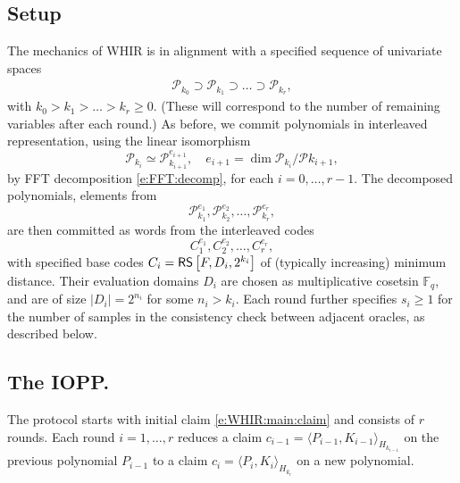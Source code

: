 \subsection{Setup}
The mechanics of WHIR is in alignment with a specified sequence of univariate spaces
\begin{align}
\label{e:chain:function:spaces}
\mathscr P_{k_0} \supset \mathscr P_{k_1} \supset \ldots \supset \mathscr P_{k_r},
\end{align}
with $k_{0} > k_1 > \ldots > k_{r}\geq 0$. 
(These will correspond to the number of remaining variables after each round.)
As before, we commit polynomials in interleaved representation, using the linear isomorphism
\[
\mathscr P_{k_i} \simeq \mathscr P_{k_{i+1}}^{e_{i+1}}, \quad e_{i+1} = \dim{\mathscr P_{k_i}/\mathscr P{k_{i+1}}},
\]
by FFT decomposition \eqref{e:FFT:decomp}, for each $i=0,\ldots, r-1$.
The decomposed polynomials, elements from
\begin{equation}
\mathscr P_{k_1}^{e_1}, \mathscr P_{k_2}^{e_2}, \ldots, \mathscr P_{k_{r}}^{e_{r}},
\end{equation}
are then %
committed as words from the interleaved codes
\begin{equation}
 C_1^{e_1}, C_2^{e_2}, \ldots, C_r^{e_r},
\end{equation}
with specified base codes $C_{i} = \mathsf{RS}\left[F, D_{i}, 2^{k_{i}}\right]$ of (typically increasing) minimum distance.
Their evaluation domains $D_i$ are chosen as multiplicative cosets\footnotemark in $\mathbb F_q$, and are of size $|D_{i}|= 2^{n_{i}}$ for some $n_i > k_{i}$. 
Each round further specifies $s_i\geq 1$ for the number of samples in the consistency check between adjacent oracles, as described below.


\subsection{The IOPP.}

The protocol starts with initial claim \eqref{e:WHIR:main:claim} and consists of $r$ rounds. 
Each round $i=1,\ldots,r$ reduces a claim $c_{i-1} = \langle P_{i-1}, K_{i-1}\rangle_{H_{k_{i-1}}}$ on the previous polynomial $P_{i-1}$ to a claim $c_{i} = \langle P_{i}, K_{i}\rangle_{H_{k_i}}$ on a new polynomial.

